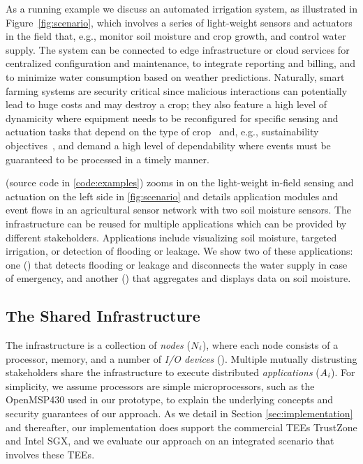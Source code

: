 As a running example we discuss an automated irrigation system, as illustrated
in Figure~\ref{fig:scenario}, which involves a series of light-weight sensors
and actuators in the field that, e.g., monitor soil moisture and crop growth,
and control water supply. The system can be connected to edge infrastructure or
cloud services for centralized configuration and maintenance, to integrate
reporting and billing, and to minimize water consumption based on weather
predictions. Naturally, smart farming systems are security critical since
malicious interactions can potentially lead to huge costs and may destroy a
crop; they also feature a high level of dynamicity where equipment needs to be
reconfigured for specific sensing and actuation tasks that depend on the type of
crop~\cite{raghavan_computational_2016} and, e.g., sustainability
objectives~\cite{streed_how_2021}, and demand a high level of dependability
where events must be guaranteed to be processed in a timely manner.

 (source code in \cref{code:examples}) zooms in on the
light-weight in-field sensing and actuation on the left side in
\cref{fig:scenario} and details application modules and event flows in an
agricultural sensor network with two soil moisture sensors. The infrastructure
can be reused for multiple applications which can be provided by different
stakeholders. Applications include visualizing soil moisture, targeted
irrigation, or detection of flooding or leakage. We show two of these
applications: one (\appvio) that detects flooding or leakage and disconnects the
water supply in case of emergency, and another (\appavl) that aggregates and
displays data on soil moisture.

\subsection{The Shared Infrastructure}
\label{concept:shared-infrastructure}
\label{concept:nodes}
%
The infrastructure is a collection of \emph{nodes} ($N_\textit{i}$), where each node
consists of a processor, memory, and a number of \emph{I/O devices} ().
Multiple mutually distrusting stakeholders share the infrastructure to execute
distributed \emph{applications} ($A_\textit{i}$). For simplicity, we assume
processors are simple microprocessors, such as the OpenMSP430 used in our
prototype, to explain the underlying concepts and security guarantees of our
approach. As we detail in Section \ref{sec:implementation} and thereafter, our
implementation does support the commercial \acp{TEE} TrustZone and Intel
\ac{SGX}, and we evaluate our approach on an integrated scenario that involves
these \acp{TEE}.
 
